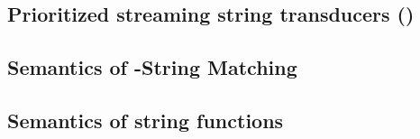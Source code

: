 %
%
%


\subsection{Prioritized streaming string transducers (\PSST)}





\subsection{Semantics of \regexp-String Matching} \label{sect:regextopsst}







\subsection{Semantics of string functions}